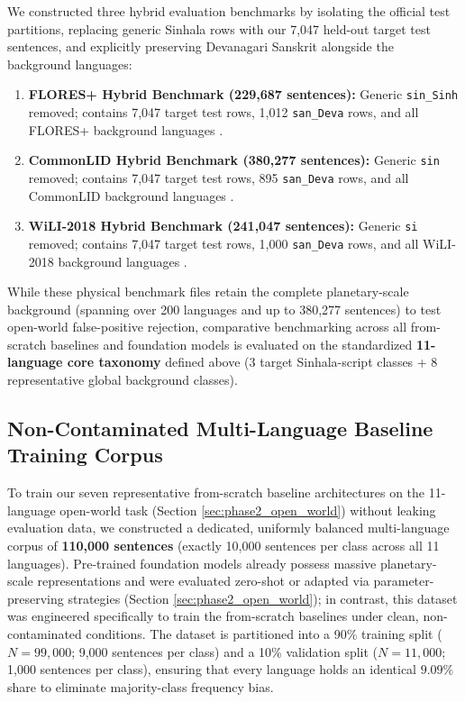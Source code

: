 \documentclass[11pt]{article}
\begin{document}
We constructed three hybrid evaluation benchmarks by isolating the official test partitions, replacing generic Sinhala rows with our 7,047 held-out target test sentences, and explicitly preserving Devanagari Sanskrit alongside the background languages:
\begin{enumerate}
    \item \textbf{FLORES+ Hybrid Benchmark (229,687 sentences):} Generic \texttt{sin\_Sinh} removed; contains 7,047 target test rows, 1,012 \texttt{san\_Deva} rows, and all FLORES+ background languages \cite{goyal2022flores}.
    \item \textbf{CommonLID Hybrid Benchmark (380,277 sentences):} Generic \texttt{sin} removed; contains 7,047 target test rows, 895 \texttt{san\_Deva} rows, and all CommonLID background languages \cite{dunn2023commonlid}.
    \item \textbf{WiLI-2018 Hybrid Benchmark (241,047 sentences):} Generic \texttt{si} removed; contains 7,047 target test rows, 1,000 \texttt{san\_Deva} rows, and all WiLI-2018 background languages \cite{thoma2018wili}.
\end{enumerate}
While these physical benchmark files retain the complete planetary-scale background (spanning over 200 languages and up to 380,277 sentences) to test open-world false-positive rejection, comparative benchmarking across all from-scratch baselines and foundation models is evaluated on the standardized \textbf{11-language core taxonomy} defined above (3 target Sinhala-script classes + 8 representative global background classes).

\subsection{Non-Contaminated Multi-Language Baseline Training Corpus}
\label{sec:multilang_train_corpus}
To train our seven representative from-scratch baseline architectures on the 11-language open-world task (Section \ref{sec:phase2_open_world}) without leaking evaluation data, we constructed a dedicated, uniformly balanced multi-language corpus of \textbf{110,000 sentences} (exactly 10,000 sentences per class across all 11 languages). Pre-trained foundation models already possess massive planetary-scale representations and were evaluated zero-shot or adapted via parameter-preserving strategies (Section \ref{sec:phase2_open_world}); in contrast, this dataset was engineered specifically to train the from-scratch baselines under clean, non-contaminated conditions. The dataset is partitioned into a 90\% training split ($N=99,000$; 9,000 sentences per class) and a 10\% validation split ($N=11,000$; 1,000 sentences per class), ensuring that every language holds an identical $9.09\%$ share to eliminate majority-class frequency bias.
\end{document}
